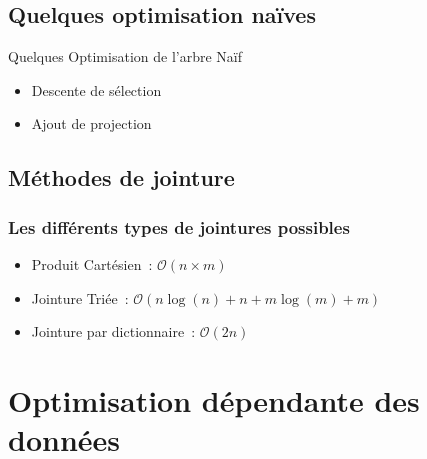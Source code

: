 \documentclass[aspectratio=43,12pt]{beamer}
\begin{document}
\subsection{Quelques optimisation naïves}
\begin{frame}{Quelques Optimisation de l'arbre Naïf}
    \begin{itemize}
        \item Descente de sélection
        \item Ajout de projection
    \end{itemize}
\end{frame}

\subsection{Méthodes de jointure}
\begin{frame}
    \frametitle{Les différents types de jointures possibles}
    \begin{itemize}
        \item Produit Cartésien : \( \mathcal{O}(n \times m)\)\\
        \item Jointure Triée :  \( \mathcal{O}(n \log(n) + n + m\log(m) +m)\)
        \item Jointure par dictionnaire : \( \mathcal{O}(2n)\)
    \end{itemize}
\end{frame}

\section{Optimisation dépendante des données}
\end{document}
